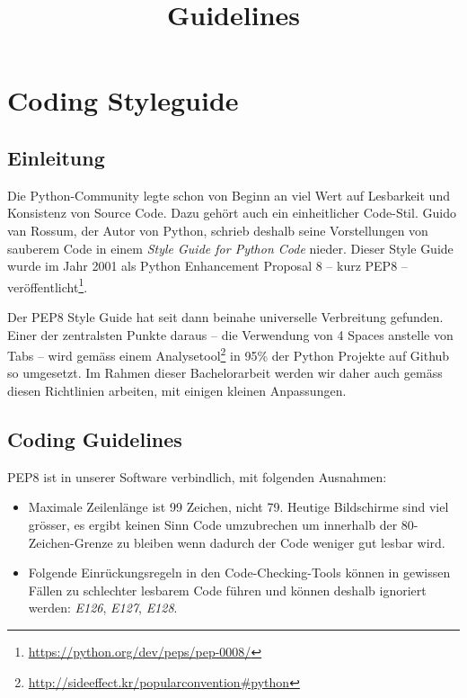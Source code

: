 \documentclass{article}
\begin{document}
\title{Guidelines}

\maketitle

\tableofcontents

\section{Coding Styleguide}

\subsection{Einleitung}

Die Python-Community legte schon von Beginn an viel Wert auf Lesbarkeit und
Konsistenz von Source Code. Dazu gehört auch ein einheitlicher Code-Stil.  Guido
van Rossum, der Autor von Python, schrieb deshalb seine Vorstellungen von
sauberem Code in einem \textit{Style Guide for Python Code} nieder. Dieser Style
Guide wurde im Jahr 2001 als Python Enhancement Proposal 8 -- kurz PEP8 --
veröffentlicht\footnote{\url{https://python.org/dev/peps/pep-0008/}}.

Der PEP8 Style Guide hat seit dann beinahe universelle Verbreitung gefunden.
Einer der zentralsten Punkte daraus -- die Verwendung von 4 Spaces anstelle von
Tabs -- wird gemäss einem
Analysetool\footnote{\url{http://sideeffect.kr/popularconvention\#python}} in
95\% der Python Projekte auf Github so umgesetzt. Im Rahmen dieser Bachelorarbeit
werden wir daher auch gemäss diesen Richtlinien arbeiten, mit einigen kleinen
Anpassungen.

\subsection{Coding Guidelines}

PEP8 ist in unserer Software verbindlich, mit folgenden Ausnahmen:

\begin{itemize}
	\item Maximale Zeilenlänge ist 99 Zeichen, nicht 79. Heutige Bildschirme sind
		viel grösser, es ergibt keinen Sinn Code umzubrechen um innerhalb der
		80-Zeichen-Grenze zu bleiben wenn dadurch der Code weniger gut lesbar wird.
	\item Folgende Einrückungsregeln in den Code-Checking-Tools können in gewissen
		Fällen zu schlechter lesbarem Code führen und können deshalb ignoriert
		werden: \textit{E126}, \textit{E127}, \textit{E128}.
\end{itemize}
\end{document}
